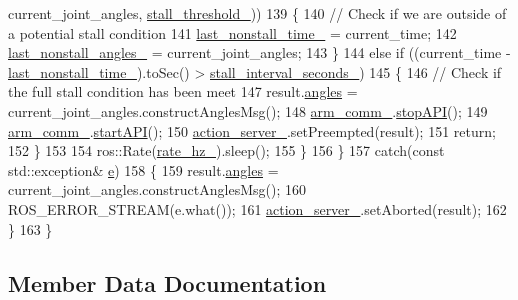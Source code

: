\begin{DoxyCode}
      current\_joint\_angles, \hyperlink{classjaco_1_1JacoAnglesActionServer_a7372c88107de61bb149cea6a60932f71}{stall\_threshold\_}))
139             \{
140                 \textcolor{comment}{// Check if we are outside of a potential stall condition}
141                 \hyperlink{classjaco_1_1JacoAnglesActionServer_afca8c9e29d0249737632a232e149400d}{last\_nonstall\_time\_} = current\_time;
142                 \hyperlink{classjaco_1_1JacoAnglesActionServer_adb99422d834b8a2fa5f26ddd3ac95e52}{last\_nonstall\_angles\_} = current\_joint\_angles;
143             \}
144             \textcolor{keywordflow}{else} \textcolor{keywordflow}{if} ((current\_time - \hyperlink{classjaco_1_1JacoAnglesActionServer_afca8c9e29d0249737632a232e149400d}{last\_nonstall\_time\_}).toSec() > 
      \hyperlink{classjaco_1_1JacoAnglesActionServer_a2bf773e52f5d3751001415e8121fe276}{stall\_interval\_seconds\_})
145             \{
146                 \textcolor{comment}{// Check if the full stall condition has been meet}
147                 result.\hyperlink{structjaco__msgs_1_1ArmJointAnglesResult___a5b6fe64a0d822194474af38863a9f8a2}{angles} = current\_joint\_angles.constructAnglesMsg();
148                 \hyperlink{classjaco_1_1JacoAnglesActionServer_a72ed0ccae4532199d387cc3bfe278cb0}{arm\_comm\_}.\hyperlink{classjaco_1_1JacoComm_a54862830cd6414ae3ae48e46e54bf798}{stopAPI}();
149                 \hyperlink{classjaco_1_1JacoAnglesActionServer_a72ed0ccae4532199d387cc3bfe278cb0}{arm\_comm\_}.\hyperlink{classjaco_1_1JacoComm_a6b2a1fabc4e6c30da42c9a5e26757398}{startAPI}();
150                 \hyperlink{classjaco_1_1JacoAnglesActionServer_a29d204d1bff466987e69761085a3c532}{action\_server\_}.setPreempted(result);
151                 \textcolor{keywordflow}{return};
152             \}
153 
154             ros::Rate(\hyperlink{classjaco_1_1JacoAnglesActionServer_aba435023cc4e95378e8c77333bef1ccf}{rate\_hz\_}).sleep();
155         \}
156     \}
157     \textcolor{keywordflow}{catch}(\textcolor{keyword}{const} std::exception& \hyperlink{namespace__setup__util_acdce690b925de33d6249bbbfa1109d61}{e})
158     \{
159         result.\hyperlink{structjaco__msgs_1_1ArmJointAnglesResult___a5b6fe64a0d822194474af38863a9f8a2}{angles} = current\_joint\_angles.constructAnglesMsg();
160         ROS\_ERROR\_STREAM(e.what());
161         \hyperlink{classjaco_1_1JacoAnglesActionServer_a29d204d1bff466987e69761085a3c532}{action\_server\_}.setAborted(result);
162     \}
163 \}
\end{DoxyCode}


\subsection{Member Data Documentation}
